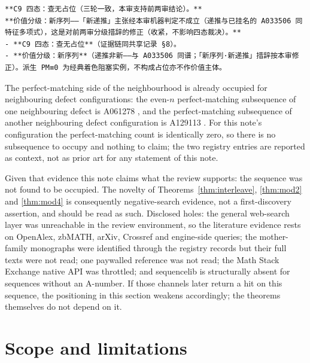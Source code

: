 \documentclass[11pt]{article}
\theoremstyle{definition}
\begin{document}
\begin{lstlisting}[caption={Verbatim quote, original record (Chinese, kept untranslated): the C9 third-round verdict, from \texttt{audit/c9-record.md} (source \texttt{deep-recheck-combm-02.md}, section 0 and section 6).}, basicstyle=\ttfamily\footnotesize,frame=none,label={lst:c9verdict}]
**C9 四态：查无占位（三轮一致，本审支持前两审结论）。**
**价值分级：新序列——「新递推」主张经本审机器判定不成立（递推与已挂名的 A033506 同特征多项式），这是对前两审分级措辞的修正（收紧，不影响四态裁决）。**
- **C9 四态：查无占位**（证据链同共享记录 §8）。
- **价值分级：新序列**（递推非新——与 A033506 同谱；「新序列·新递推」措辞按本审修正）。派生 PM≡0 为经典着色阻塞实例，不构成占位亦不作价值主体。
\end{lstlisting}

The perfect-matching side of the neighbourhood is already occupied for
neighbouring defect configurations: the even-$n$ perfect-matching subsequence
of one neighbouring defect is A061278 \cite{oeis-a061278}, and the
perfect-matching subsequence of another neighbouring defect configuration is
A129113 \cite{oeis-a129113}. For this note's configuration the
perfect-matching count is identically zero, so there is no subsequence to
occupy and nothing to claim; the two registry entries are reported as
context, not as prior art for any statement of this note.

Given that evidence this note claims what the review supports: the sequence
was not found to be occupied. The novelty of Theorems~\ref{thm:interleave},
\ref{thm:mod2} and \ref{thm:mod4} is consequently negative-search evidence,
not a first-discovery assertion, and should be read as such. Disclosed holes:
the general web-search layer was unreachable in the review environment, so
the literature evidence rests on OpenAlex, zbMATH, arXiv, Crossref and
engine-side queries; the mother-family monographs \cite{lundow1996} were
identified through the registry records but their full texts were not read;
one paywalled reference was not read; the Math Stack Exchange native API was
throttled; and sequencelib is structurally absent for sequences without an
A-number. If those channels later return a hit on this sequence, the
positioning in this section weakens accordingly; the theorems themselves do
not depend on it.

\section{Scope and limitations}
\end{document}
